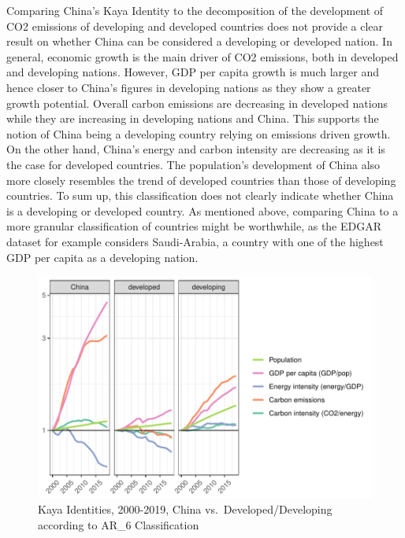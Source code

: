 \documentclass[
  12pt,
]{article}
\numberwithin{equation}{section}
\numberwithin{table}{section}
\numberwithin{figure}{section}
\begin{document}
Comparing China's Kaya Identity to the decomposition of the development
of CO2 emissions of developing and developed countries does not provide
a clear result on whether China can be considered a developing or
developed nation. In general, economic growth is the main driver of CO2
emissions, both in developed and developing nations. However, GDP per
capita growth is much larger and hence closer to China's figures in
developing nations as they show a greater growth potential. Overall
carbon emissions are decreasing in developed nations while they are
increasing in developing nations and China. This supports the notion of
China being a developing country relying on emissions driven growth. On
the other hand, China's energy and carbon intensity are decreasing as it
is the case for developed countries. The population's development of
China also more closely resembles the trend of developed countries than
those of developing countries. To sum up, this classification does not
clearly indicate whether China is a developing or developed country. As
mentioned above, comparing China to a more granular classification of
countries might be worthwhile, as the EDGAR dataset for example
considers Saudi-Arabia, a country with one of the highest GDP per capita
as a developing nation.

\begin{figure}
\centering
\includegraphics{Paper_files/figure-latex/unnamed-chunk-4-1.pdf}
\caption{Kaya Identities, 2000-2019, China vs.~Developed/Developing
according to AR\_6 Classification}
\end{figure}
\end{document}
